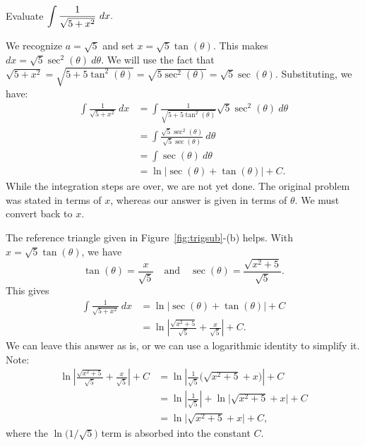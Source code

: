 \begin{example} \label{eg:5.3.2} %

Evaluate $\ds \int \frac{1}{\sqrt{5+x^2}}\ dx.$

\solution We recognize $a=\sqrt{5}$ and  set $x= \sqrt{5}\tan(\theta)$. This makes $dx = \sqrt{5}\sec^2(\theta)\ d\theta$. We will use the fact that $\sqrt{5+x^2} = \sqrt{5+5\tan^2(\theta)} = \sqrt{5\sec^2(\theta)} = \sqrt{5}\sec(\theta).$ Substituting, we have:
\begin{align*}
\int \frac{1}{\sqrt{5+x^2}}\ dx &= \int \frac{1}{\sqrt{5+5\tan^2(\theta)}}\sqrt{5}\sec^2(\theta)\ d\theta \\
			&= \int \frac{\sqrt{5}\sec^2(\theta)}{\sqrt{5}\sec(\theta)} \ d\theta\\
			&= \int \sec(\theta)\ d\theta\\
			&= \ln\big|\sec(\theta)+\tan(\theta)\big|+C.
\end{align*}
While the integration steps are over, we are not yet done. The original problem was stated in terms of $x$, whereas our answer is given in terms of $\theta$. We must convert back to $x$.

The reference triangle given in Figure~\ref{fig:trigsub}-(b) helps. With $x=\sqrt{5}\tan(\theta)$, we have 
$$\tan(\theta) = \frac x{\sqrt{5}}\quad \text{and}\quad \sec(\theta) = \frac{\sqrt{x^2+5}}{\sqrt{5}}.$$
This gives
\begin{align*}
\int \frac{1}{\sqrt{5+x^2}}\ dx &= \ln\big|\sec(\theta)+\tan(\theta)\big|+C \\
     &= \ln\left|\frac{\sqrt{x^2+5}}{\sqrt{5}}+ \frac x{\sqrt{5}}\right|+C.
\end{align*}
We can leave this answer as is, or we can use a logarithmic identity to simplify it. Note:
\begin{align*}
\ln\left|\frac{\sqrt{x^2+5}}{\sqrt{5}}+ \frac x{\sqrt{5}}\right|+C &= \ln\left|\frac{1}{\sqrt{5}}\big(\sqrt{x^2+5}+ x\big)\right|+C \\
   &= \ln\left|\frac{1}{\sqrt{5}}\right| + \ln\big|\sqrt{x^2+5}+ x\big|+C\\
	&=	\ln\big|\sqrt{x^2+5}+ x\big|+C,
\end{align*}
where the $\ln\big(1/\sqrt{5}\big)$ term is absorbed into the constant $C$.

\end{example}